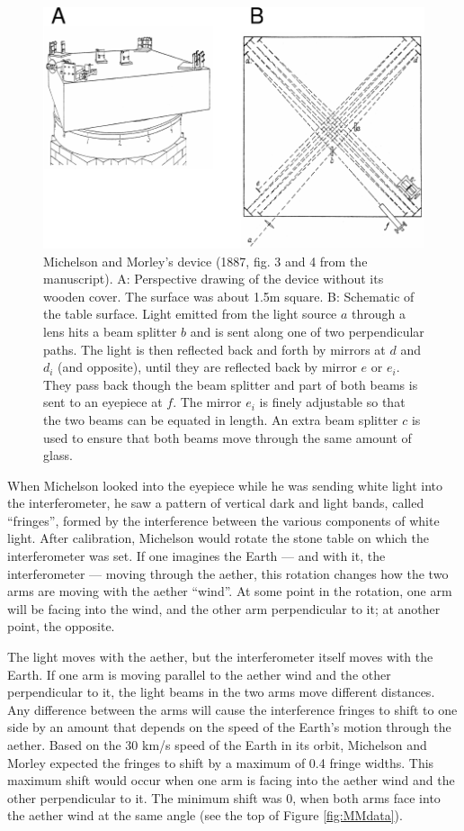 \documentclass[english,floatsintext,man]{apa6}
\theoremstyle{definition}
\theoremstyle{definition}
\theoremstyle{definition}
\theoremstyle{remark}
\begin{document}
\begin{figure}
\centering
\includegraphics{paper_pdf_files/figure-latex/MMapp-1.pdf}
\caption{\label{fig:MMapp}Michelson and Morley's device (1887, fig. 3 and 4
from the manuscript). A: Perspective drawing of the device without its
wooden cover. The surface was about 1.5m square. B: Schematic of the
table surface. Light emitted from the light source \(a\) through a lens
hits a beam splitter \(b\) and is sent along one of two perpendicular
paths. The light is then reflected back and forth by mirrors at \(d\)
and \(d_i\) (and opposite), until they are reflected back by mirror
\(e\) or \(e_i\). They pass back though the beam splitter and part of
both beams is sent to an eyepiece at \(f\). The mirror \(e_i\) is finely
adjustable so that the two beams can be equated in length. An extra beam
splitter \(c\) is used to ensure that both beams move through the same
amount of glass.}
\end{figure}

When Michelson looked into the eyepiece while he was sending white light
into the interferometer, he saw a pattern of vertical dark and light
bands, called \enquote{fringes}, formed by the interference between the
various components of white light. After calibration, Michelson would
rotate the stone table on which the interferometer was set. If one
imagines the Earth --- and with it, the interferometer --- moving
through the aether, this rotation changes how the two arms are moving
with the aether \enquote{wind}. At some point in the rotation, one arm
will be facing into the wind, and the other arm perpendicular to it; at
another point, the opposite.

The light moves with the aether, but the interferometer itself moves
with the Earth. If one arm is moving parallel to the aether wind and the
other perpendicular to it, the light beams in the two arms move
different distances. Any difference between the arms will cause the
interference fringes to shift to one side by an amount that depends on
the speed of the Earth's motion through the aether. Based on the 30 km/s
speed of the Earth in its orbit, Michelson and Morley expected the
fringes to shift by a maximum of 0.4 fringe widths. This maximum shift
would occur when one arm is facing into the aether wind and the other
perpendicular to it. The minimum shift was 0, when both arms face into
the aether wind at the same angle (see the top of Figure
\ref{fig:MMdata}).
\end{document}
